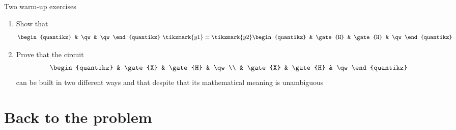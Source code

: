 \documentclass{beamer}
\begin{document}
\begin{frame}{Two warm-up exercises}
        \begin{enumerate}
                \item Show that
                        \[
                        \begin{quantikz}
                                & \qw & \qw 
                        \end{quantikz}\
                        \tikzmark{y1} = \tikzmark{y2}
                        \begin{quantikz}
                                & \gate{H} & \gate{H} & \qw 
                        \end{quantikz}
                        \]

                        \vspace{1.2cm}
                \item Prove that the circuit
                        \[
                        \begin{quantikz}
                                & \gate{X} & \gate{H} & \qw \\
                                & \gate{X} & \gate{H} & \qw
                        \end{quantikz}
                        \]
                       can be built in two different ways and that despite that
                       its mathematical meaning is unambiguous
       \end{enumerate}


\end{frame}

\section{Back to the problem}
\end{document}
